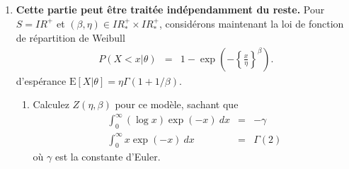 \documentclass[10pt]{article}
\newcommand{\R}{I\!\!R}
\newcommand{\E}{\mbox{E}}
\newcommand{\1}{\mathbbm{1}}
\begin{document}
\begin{enumerate}
 
\item {\bf Cette partie peut \^etre trait\'ee ind\'ependamment du reste.} Pour $S=\R^+$ et $(\beta,\eta)\in\R^+_* \times \R^+_*$, consid\'erons maintenant la loi de fonction de r\'epartition de Weibull
\begin{eqnarray*}
P(X<x|\theta) & = & 1-\exp\left(-\left\{\frac{x}{\eta}\right\}^{\beta}\right).
\end{eqnarray*}
d'esp\'erance $\E[X|\theta] =  \eta\Gamma(1+1/\beta)$.
\begin{enumerate}
\item Calculez $Z(\eta,\beta)$ pour ce mod\`ele, sachant que
\begin{eqnarray}
\int_0^{\infty} (\log x) \exp(-x) \ dx & = & -\gamma \label{aide1} \\
\int_0^{\infty} x \exp(-x) \ dx & = & \Gamma(2) \label{aide2}
\end{eqnarray}
o\`u $\gamma$ est la constante d'Euler. %
    


\end{enumerate}
\end{enumerate}
\end{document}

